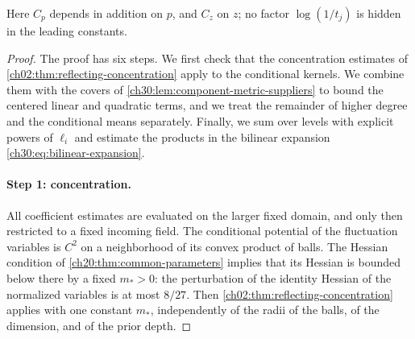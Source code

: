 Here $C_p$ depends in addition on $p$, and $C_z$ on $z$; no factor $\log(1/t_j)$ is hidden in the leading constants.

\begin{proof}
The proof has six steps. We first check that the concentration estimates of \cref{ch02:thm:reflecting-concentration} apply to the conditional kernels. We combine them with the covers of \cref{ch30:lem:component-metric-suppliers} to bound the centered linear and quadratic terms, and we treat the remainder of higher degree and the conditional means separately. Finally, we sum over levels with explicit powers of $\ell_i$ and estimate the products in the bilinear expansion \eqref{ch30:eq:bilinear-expansion}.

\paragraph{Step 1: concentration.} All coefficient estimates are evaluated on the larger fixed domain, and only then restricted to a fixed incoming field. The conditional potential of the fluctuation variables is $C^2$ on a neighborhood of its convex product of balls. The Hessian condition of \cref{ch20:thm:common-parameters} implies that its Hessian is bounded below there by a fixed $m_*>0$: the perturbation of the identity Hessian of the normalized variables is at most $8/27$. Then \cref{ch02:thm:reflecting-concentration} applies with one constant $m_*$, independently of the radii of the balls, of the dimension, and of the prior depth.


\end{proof}
